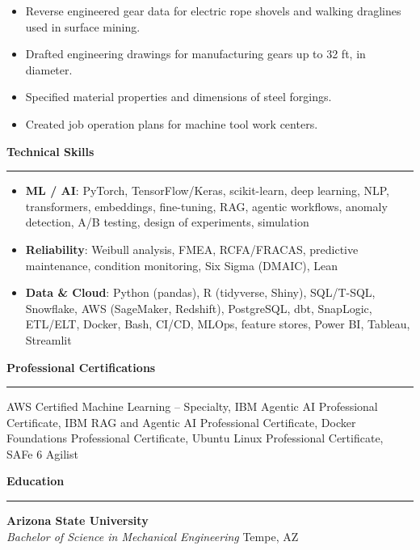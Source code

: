 \documentclass[10pt, letterpaper, sans]{article}
\newcommand{\sectionheader}[1]{%
 \vspace{11pt}%
 \par\noindent\textbf{\Large #1}\par\hrule\vspace{5pt}%
}
\begin{document}
\begin{itemize} 
    
    \item Reverse engineered gear data for electric rope shovels and walking draglines used in surface mining.

    \item Drafted engineering drawings for manufacturing gears up to 32 ft, in diameter.

    \item Specified material properties and dimensions of steel forgings.

    \item Created job operation plans for machine tool work centers. 
  
\end{itemize}







\sectionheader{Technical Skills}

\begin{itemize} 
    
    \item \textbf{ML / AI}: PyTorch, TensorFlow/Keras, scikit-learn, deep learning, NLP, transformers, embeddings, fine-tuning, RAG, agentic workflows, anomaly detection, A/B testing, design of experiments, simulation
    
    \item \textbf{Reliability}: Weibull analysis, FMEA, RCFA/FRACAS, predictive maintenance, condition monitoring, Six Sigma (DMAIC), Lean
    
    \item \textbf{Data \& Cloud}: Python (pandas), R (tidyverse, Shiny), SQL/T-SQL, Snowflake, AWS (SageMaker, Redshift), PostgreSQL, dbt, SnapLogic, ETL/ELT, Docker, Bash, CI/CD, MLOps, feature stores, Power BI, Tableau, Streamlit
  
\end{itemize}


\sectionheader{Professional Certifications}
AWS Certified Machine Learning – Specialty,
IBM Agentic AI Professional Certificate,
IBM RAG and Agentic AI Professional Certificate,
Docker Foundations Professional Certificate,
Ubuntu Linux Professional Certificate,
\\ SAFe 6 Agilist

\sectionheader{Education}
\textbf{Arizona State University} \\
\textit{Bachelor of Science in Mechanical Engineering} \hfill Tempe, AZ
\end{document}
